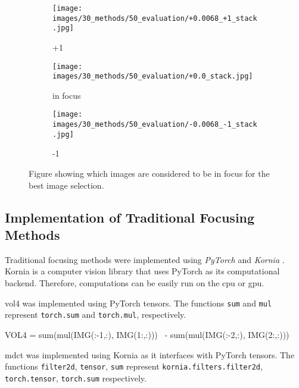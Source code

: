 \begin{figure}[tb]
    \centering
    \begin{subfigure}[t]{0.3\textwidth}
        \centering
        \texttt{[image: images/30\_methods/50\_evaluation/+0.0068\_+1\_stack.jpg]}
        \caption{+1}
    \end{subfigure}
    \begin{subfigure}[t]{0.3\textwidth}
        \centering
        \texttt{[image: images/30\_methods/50\_evaluation/+0.0\_stack.jpg]}
        \caption{in focus}
    \end{subfigure}
    \begin{subfigure}[t]{0.3\textwidth}
        \centering
        \texttt{[image: images/30\_methods/50\_evaluation/-0.0068\_-1\_stack.jpg]}
        \caption{-1}
    \end{subfigure}

    \caption{Figure showing which images are considered to be in focus for the best image selection.}
    \label{fig:Methods:Data:InFocusExampleImages}
\end{figure}


\subsection{Implementation of Traditional Focusing Methods}
\label{sec:Methods:Evaluation:Traditional}

Traditional focusing methods were implemented using \emph{PyTorch} \cite{paszke2019pytorch} and \emph{Kornia} \cite{riba2020kornia}. Kornia is a computer vision library that uses PyTorch as its computational backend. Therefore, computations can be easily run on the \ac{cpu} or \ac{gpu}.


\Ac{vol4} was implemented using PyTorch tensors. The functions \texttt{sum} and \texttt{mul} represent \texttt{torch.sum} and \texttt{torch.mul}, respectively.

\begin{python}
VOL4 = sum(mul(IMG(:-1,:), IMG(1:,:)))      \
        - sum(mul(IMG(:-2,:), IMG(2:,:)))
\end{python}


\Ac{mdct} was implemented using Kornia as it interfaces with PyTorch tensors. The functions \texttt{filter2d}, \texttt{tensor}, \texttt{sum} represent \texttt{kornia.filters.filter2d}, \texttt{torch.tensor}, \texttt{torch.sum} respectively.

